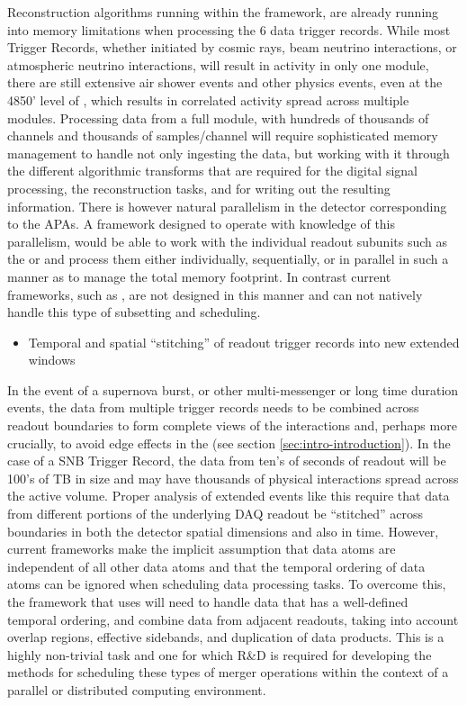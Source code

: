 \documentclass[../main-v1.tex]{subfiles}
\begin{document}
Reconstruction algorithms running within the  framework, are already running into memory limitations when processing the 6   data trigger records.  While most  Trigger Records, whether initiated by cosmic rays, beam neutrino interactions, or  atmospheric neutrino interactions, will result in activity in only one  module, there are still extensive air shower events and other physics events, even at the 4850' level of , which results in correlated activity spread across multiple modules.  Processing data from a full  module, with hundreds of thousands of channels and thousands of samples/channel will require sophisticated memory management to handle not only ingesting the data, but working with it through the different algorithmic transforms that are required for the digital signal processing, the reconstruction tasks, and for writing out the resulting information.  There is however natural parallelism in the  detector corresponding to the APAs.  A framework designed to operate with knowledge of this parallelism, would be able to work with the individual readout subunits such as the  or  and process them either individually, sequentially, or in parallel in such a manner as to manage the total memory footprint.  In contrast current frameworks, such as , are not designed in this manner and can not natively handle this type of subsetting and scheduling.

\begin{itemize}
\item Temporal and spatial ``stitching'' of readout trigger records into new extended windows
\end{itemize}

  In the event of a supernova burst, or other multi-messenger or long time duration events, the data from multiple trigger records needs to be combined across readout boundaries to form complete views of the interactions
  and, perhaps more crucially, to avoid edge effects in the  (see section \ref{sec:intro-introduction}).  In the case of a SNB Trigger Record, the data from ten's of seconds of readout will be 100's of TB in size and may have thousands of physical interactions spread across the active volume.  Proper analysis of extended events like this require that data from different portions of the underlying DAQ readout be ``stitched'' across boundaries in both the detector spatial dimensions and also in time.  However, current  frameworks make the implicit assumption that data atoms are independent of all other data atoms and that the temporal ordering of data atoms can be ignored when scheduling data processing tasks.  To overcome this, the framework that  uses will need to handle data that has a well-defined temporal ordering, and combine data from adjacent readouts, taking into account overlap regions, effective sidebands, and duplication of data products.  This is a highly non-trivial task and one for which R\&D is required for developing the methods for scheduling these types of merger operations within the context of a parallel or distributed computing environment.
\end{document}
